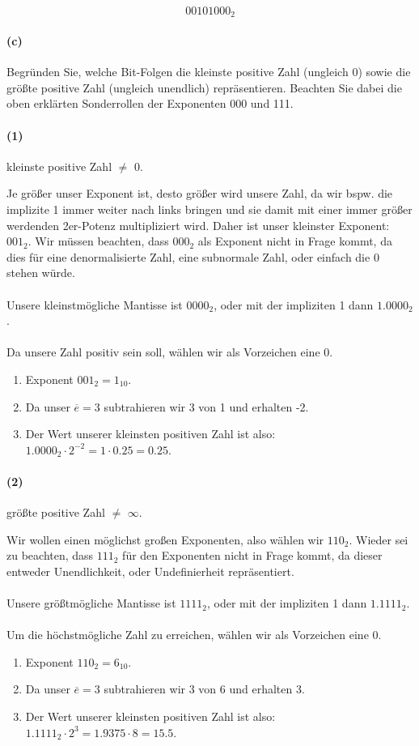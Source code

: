 \documentclass[12pt, letterpaper]{article}
\begin{document}
$$00101000_2$$

\paragraph{(c)} Begründen Sie, welche Bit-Folgen die kleinste positive Zahl (ungleich 0) sowie die größte positive Zahl (ungleich unendlich) repräsentieren. Beachten Sie dabei die oben erklärten
Sonderrollen der Exponenten 000 und 111. \newline

\paragraph{(1)} kleinste positive Zahl $\neq$ 0.\newline

\noindent Je größer unser Exponent ist, desto größer wird unsere Zahl, da wir bspw. die implizite 1 immer weiter nach links bringen und sie damit mit einer immer größer werdenden 2er-Potenz multipliziert wird. Daher ist unser kleinster Exponent: $001_2$. Wir müssen beachten, dass $000_2$ als Exponent nicht in Frage kommt, da dies für eine denormalisierte Zahl, eine subnormale Zahl, oder einfach die 0 stehen würde.\\ \\
\noindent Unsere kleinstmögliche Mantisse ist $0000_2$, oder mit der impliziten 1 dann $1.0000_2$.\\ \\
\noindent Da unsere Zahl positiv sein soll, wählen wir als Vorzeichen eine 0.

\begin{enumerate} 
    \item Exponent $001_2 = 1_{10}$.
    \item Da unser $\overline{e} = 3$ subtrahieren wir 3 von 1 und erhalten -2.
    \item Der Wert unserer kleinsten positiven Zahl ist also: $1.0000_2 \cdot 2^{-2} = 1 \cdot 0.25 = 0.25$. 
\end{enumerate}

\paragraph{(2)} größte positive Zahl $\neq$ $\infty$.\newline

\noindent Wir wollen einen möglichst großen Exponenten, also wählen wir $110_2$. Wieder sei zu beachten, dass $111_2$ für den Exponenten nicht in Frage kommt, da dieser entweder Unendlichkeit, oder Undefinierheit repräsentiert.\\ \\
\noindent Unsere größtmögliche Mantisse ist $1111_2$, oder mit der impliziten 1 dann $1.1111_2$.\\ \\
\noindent Um die höchstmögliche Zahl zu erreichen, wählen wir als Vorzeichen eine 0.

\begin{enumerate} 
    \item Exponent $110_2 = 6_{10}$.
    \item Da unser $\overline{e} = 3$ subtrahieren wir 3 von 6 und erhalten 3.
    \item Der Wert unserer kleinsten positiven Zahl ist also: $1.1111_2 \cdot 2^{3} = 1.9375 \cdot 8 = 15.5$. 
\end{enumerate}
\end{document}
